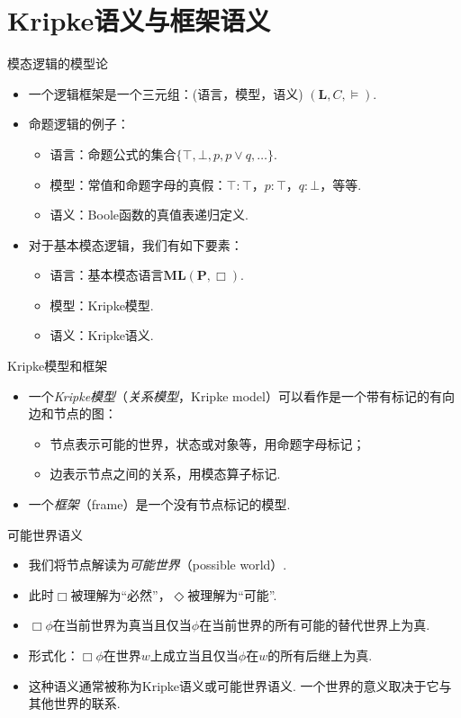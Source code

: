    \section{Kripke语义与框架语义}
    \begin{frame}{模态逻辑的模型论} 
    \begin{itemize} 
    \item 一个逻辑框架是一个三元组：(语言，模型，语义) $(\mathbf L,C,\vDash)$.
    \item 命题逻辑的例子：
    \begin{itemize}
        \item 语言：命题公式的集合$\{\top,\bot,p,p\vee q,\dots\}$.
        \item 模型：常值和命题字母的真假：$\top:\top$，$p:\top$，$q:\bot$，等等.
        \item 语义：Boole函数的真值表递归定义.
    \end{itemize}
    \item 对于基本模态逻辑，我们有如下要素：
    \begin{itemize}
        \item 语言：基本模态语言$\mathbf{ML}(\mathbf P, \Box)$.
        \item 模型：Kripke模型.
        \item 语义：Kripke语义.
    \end{itemize}
    \end{itemize} 
    \end{frame}
    
    \begin{frame}{Kripke模型和框架} 
    \begin{itemize} 
    \item 一个\emph{Kripke模型}（\emph{关系模型}，Kripke model）可以看作是一个带有标记的有向边和节点的图： 
    \begin{itemize} 
    \item 节点表示可能的世界，状态或对象等，用命题字母标记； 
    \item 边表示节点之间的关系，用模态算子标记.
    \end{itemize} 
    \item 一个\emph{框架}（frame）是一个没有节点标记的模型.
    \end{itemize} 
    \end{frame}
    
    \begin{frame}{可能世界语义} 
    \begin{itemize} 
    \item 我们将节点解读为\emph{可能世界}（possible world）.
    \item 此时$\Box$被理解为“必然”，$\Diamond$被理解为“可能”.
    \item $\Box\phi$在当前世界为真当且仅当$\phi$在当前世界的所有可能的替代世界上为真.
    \item 形式化：$\Box\phi$在世界$w$上成立当且仅当$\phi$在$w$的所有后继上为真.
    \item 这种语义通常被称为Kripke语义或可能世界语义. 一个世界的意义取决于它与其他世界的联系.
    \end{itemize} 
    \end{frame}
    
